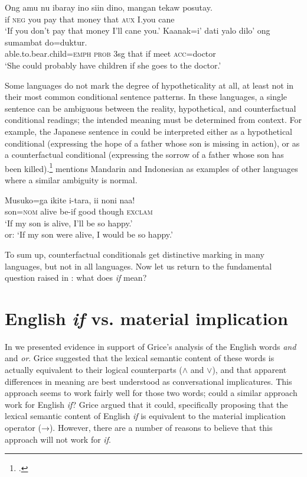 \ea
\ea \gll  Ong  amu  nu  ibaray  ino  siin  dino,  mangan  tekaw  posutay.\\
if  \textsc{neg}  you  pay  that  money  that  \textsc{aux}  I.you  cane\\
\glt ‘If you don’t pay that money I’ll cane you.’
\ex \gll  Kaanak=i’  dati  yalo  dilo’  ong  sumambat  do=duktur.\\
able.to.bear.child=\textsc{emph}  \textsc{prob}  3sg  that  if  meet  \textsc{acc}=doctor\\
\glt ‘She could probably have children if she goes to the doctor.’
\z \z


Some languages do not mark the degree of hypotheticality at all, at least not in their most common conditional sentence patterns. In these languages, a single sentence can be ambiguous between the reality, hypothetical, and counterfactual conditional readings; the intended meaning must be determined from context. For example, the Japanese sentence in  could be interpreted either as a hypothetical conditional (expressing the hope of a father whose son is missing in action), or as a counterfactual conditional (expressing the sorrow of a father whose son has been killed).\footnote{\citet[627]{Akatsuka1985}.} \citet{Comrie1986} mentions Mandarin and Indonesian as examples of other languages where a similar ambiguity is normal.


\ea
\gll Musuko=ga  ikite  i-tara,  ii  noni  naa!\\
son=\textsc{nom}  alive  be-if  good  though  \textsc{exclam}\\
\glt ‘If my son is alive, I’ll be so happy.’\\
or: ‘If my son were alive, I would be so happy.’
\z


To sum up, counterfactual conditionals get distinctive marking in many languages, but not in all languages. Now let us return to the fundamental question raised in : what does \textit{if} mean?


\section{English \textit{if} vs. material implication}\label{sec:19.4}

In  we presented evidence in support of Grice’s analysis of the English words \textit{and} and \textit{or}. Grice suggested that the lexical semantic content of these words is actually equivalent to their logical counterparts ($\wedge$ and $\vee$), and that apparent differences in meaning are best understood as conversational implicatures. This approach seems to work fairly well for those two words; could a similar approach work for English \textit{if}? Grice argued that it could, specifically proposing that the lexical semantic content of English \textit{if} is equivalent to the material implication operator (→). However, there are a number of reasons to believe that this approach will not work for \textit{if}.



